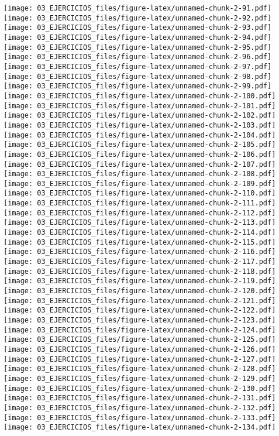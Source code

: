 \documentclass[
]{book}
\begin{document}
\texttt{[image: 03\_EJERCICIOS\_files/figure-latex/unnamed-chunk-2-91.pdf]} \texttt{[image: 03\_EJERCICIOS\_files/figure-latex/unnamed-chunk-2-92.pdf]} \texttt{[image: 03\_EJERCICIOS\_files/figure-latex/unnamed-chunk-2-93.pdf]} \texttt{[image: 03\_EJERCICIOS\_files/figure-latex/unnamed-chunk-2-94.pdf]} \texttt{[image: 03\_EJERCICIOS\_files/figure-latex/unnamed-chunk-2-95.pdf]} \texttt{[image: 03\_EJERCICIOS\_files/figure-latex/unnamed-chunk-2-96.pdf]} \texttt{[image: 03\_EJERCICIOS\_files/figure-latex/unnamed-chunk-2-97.pdf]} \texttt{[image: 03\_EJERCICIOS\_files/figure-latex/unnamed-chunk-2-98.pdf]} \texttt{[image: 03\_EJERCICIOS\_files/figure-latex/unnamed-chunk-2-99.pdf]} \texttt{[image: 03\_EJERCICIOS\_files/figure-latex/unnamed-chunk-2-100.pdf]} \texttt{[image: 03\_EJERCICIOS\_files/figure-latex/unnamed-chunk-2-101.pdf]} \texttt{[image: 03\_EJERCICIOS\_files/figure-latex/unnamed-chunk-2-102.pdf]} \texttt{[image: 03\_EJERCICIOS\_files/figure-latex/unnamed-chunk-2-103.pdf]} \texttt{[image: 03\_EJERCICIOS\_files/figure-latex/unnamed-chunk-2-104.pdf]} \texttt{[image: 03\_EJERCICIOS\_files/figure-latex/unnamed-chunk-2-105.pdf]} \texttt{[image: 03\_EJERCICIOS\_files/figure-latex/unnamed-chunk-2-106.pdf]} \texttt{[image: 03\_EJERCICIOS\_files/figure-latex/unnamed-chunk-2-107.pdf]} \texttt{[image: 03\_EJERCICIOS\_files/figure-latex/unnamed-chunk-2-108.pdf]} \texttt{[image: 03\_EJERCICIOS\_files/figure-latex/unnamed-chunk-2-109.pdf]} \texttt{[image: 03\_EJERCICIOS\_files/figure-latex/unnamed-chunk-2-110.pdf]} \texttt{[image: 03\_EJERCICIOS\_files/figure-latex/unnamed-chunk-2-111.pdf]} \texttt{[image: 03\_EJERCICIOS\_files/figure-latex/unnamed-chunk-2-112.pdf]} \texttt{[image: 03\_EJERCICIOS\_files/figure-latex/unnamed-chunk-2-113.pdf]} \texttt{[image: 03\_EJERCICIOS\_files/figure-latex/unnamed-chunk-2-114.pdf]} \texttt{[image: 03\_EJERCICIOS\_files/figure-latex/unnamed-chunk-2-115.pdf]} \texttt{[image: 03\_EJERCICIOS\_files/figure-latex/unnamed-chunk-2-116.pdf]} \texttt{[image: 03\_EJERCICIOS\_files/figure-latex/unnamed-chunk-2-117.pdf]} \texttt{[image: 03\_EJERCICIOS\_files/figure-latex/unnamed-chunk-2-118.pdf]} \texttt{[image: 03\_EJERCICIOS\_files/figure-latex/unnamed-chunk-2-119.pdf]} \texttt{[image: 03\_EJERCICIOS\_files/figure-latex/unnamed-chunk-2-120.pdf]} \texttt{[image: 03\_EJERCICIOS\_files/figure-latex/unnamed-chunk-2-121.pdf]} \texttt{[image: 03\_EJERCICIOS\_files/figure-latex/unnamed-chunk-2-122.pdf]} \texttt{[image: 03\_EJERCICIOS\_files/figure-latex/unnamed-chunk-2-123.pdf]} \texttt{[image: 03\_EJERCICIOS\_files/figure-latex/unnamed-chunk-2-124.pdf]} \texttt{[image: 03\_EJERCICIOS\_files/figure-latex/unnamed-chunk-2-125.pdf]} \texttt{[image: 03\_EJERCICIOS\_files/figure-latex/unnamed-chunk-2-126.pdf]} \texttt{[image: 03\_EJERCICIOS\_files/figure-latex/unnamed-chunk-2-127.pdf]} \texttt{[image: 03\_EJERCICIOS\_files/figure-latex/unnamed-chunk-2-128.pdf]} \texttt{[image: 03\_EJERCICIOS\_files/figure-latex/unnamed-chunk-2-129.pdf]} \texttt{[image: 03\_EJERCICIOS\_files/figure-latex/unnamed-chunk-2-130.pdf]} \texttt{[image: 03\_EJERCICIOS\_files/figure-latex/unnamed-chunk-2-131.pdf]} \texttt{[image: 03\_EJERCICIOS\_files/figure-latex/unnamed-chunk-2-132.pdf]} \texttt{[image: 03\_EJERCICIOS\_files/figure-latex/unnamed-chunk-2-133.pdf]} \texttt{[image: 03\_EJERCICIOS\_files/figure-latex/unnamed-chunk-2-134.pdf]} 
\end{document}

